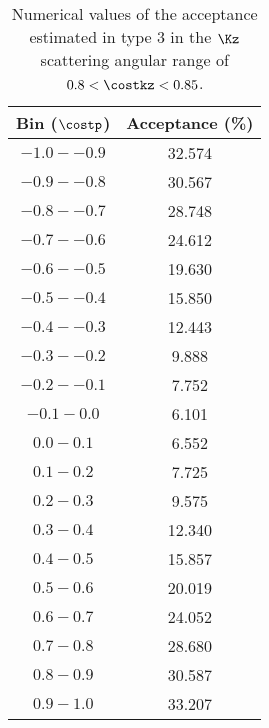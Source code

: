 \begin{table}[!h] 
  \begin{center}
  \caption{Numerical values of the acceptance estimated in type 3 in the $\Kz$ scattering angular range of \textbf{$0.8<\costkz<0.85$}.}
  \centering
  \begin{threeparttable}
    \begin{tabular}{cc}
    Bin ($\costp$) & Acceptance (\%) \\
    \midrule\midrule
    $-1.0 - -0.9$ & 32.574 \\
    \midrule
    $-0.9 - -0.8$ & 30.567 \\
    \midrule
    $-0.8 - -0.7$ & 28.748 \\
    \midrule
    $-0.7 - -0.6$ & 24.612 \\
    \midrule
    $-0.6 - -0.5$ & 19.630 \\
    \midrule
    $-0.5 - -0.4$ & 15.850 \\
    \midrule
    $-0.4 - -0.3$ & 12.443 \\
    \midrule
    $-0.3 - -0.2$ & 9.888 \\
    \midrule
    $-0.2 - -0.1$ & 7.752 \\
    \midrule
    $-0.1 - 0.0$ & 6.101 \\
    \midrule
    $0.0 - 0.1$ & 6.552 \\
    \midrule
    $0.1 - 0.2$ & 7.725 \\
    \midrule
    $0.2 - 0.3$ & 9.575 \\
    \midrule
    $0.3 - 0.4$ & 12.340 \\
    \midrule
    $0.4 - 0.5$ & 15.857 \\
    \midrule
    $0.5 - 0.6$ & 20.019 \\
    \midrule
    $0.6 - 0.7$ & 24.052 \\
    \midrule
    $0.7 - 0.8$ & 28.680 \\
    \midrule
    $0.8 - 0.9$ & 30.587 \\
    \midrule
    $0.9 - 1.0$ & 33.207 \\
    \end{tabular}
  \end{threeparttable}
  \label{tab-Pl-acc_36}
  \end{center}
\end{table}

